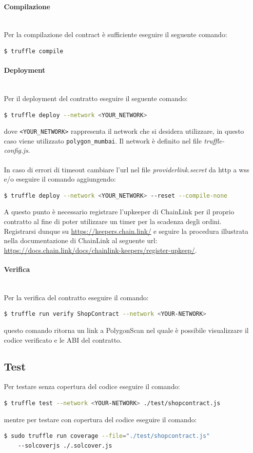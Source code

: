 \documentclass[a4paper, 12pt]{article}
\begin{document}
\paragraph{Compilazione}\\
Per la compilazione del contract è sufficiente eseguire il seguente comando:
\begin{lstlisting}[language=bash]
  $ truffle compile
\end{lstlisting}
\paragraph{Deployment}\\
Per il deployment del contratto eseguire il seguente comando:
\begin{lstlisting}[language=bash]
  $ truffle deploy --network <YOUR_NETWORK>
\end{lstlisting}
dove \verb|<YOUR_NETWORK>| rappresenta il network che si desidera utilizzare, in questo caso viene utilizzato \verb|polygon_mumbai|. Il network è definito nel file \textit{truffle-config.js}.\\ \\
In caso di errori di timeout cambiare l'url nel file \textit{providerlink.secret} da http a wss e/o eseguire il comando aggiungendo:
\begin{lstlisting}[language=bash]
  $ truffle deploy --network <YOUR_NETWORK> --reset --compile-none
\end{lstlisting}
A questo punto è necessario registrare l'upkeeper di ChainLink per il proprio contratto al fine di poter utilizzare un timer per la scadenza degli ordini. Registrarsi dunque su \url{https://keepers.chain.link/} e seguire la procedura illustrata nella documentazione di ChainLink al seguente url: \url{https://docs.chain.link/docs/chainlink-keepers/register-upkeep/}.
\paragraph{Verifica}\\
Per la verifica del contratto eseguire il comando:
\begin{lstlisting}[language=bash]
  $ truffle run verify ShopContract --network <YOUR-NETWORK>
\end{lstlisting}
questo comando ritorna un link a PolygonScan nel quale è possibile visualizzare il codice verificato e le ABI del contratto.
\subsection{Test}
Per testare senza copertura del codice eseguire il comando:
\begin{lstlisting}[language=bash]
  $ truffle test --network <YOUR-NETWORK> ./test/shopcontract.js
\end{lstlisting}
mentre per testare con copertura del codice eseguire il comando:
\begin{lstlisting}[language=bash]
  $ sudo truffle run coverage --file="./test/shopcontract.js"
    --solcoverjs ./.solcover.js
\end{lstlisting}
\end{document}

